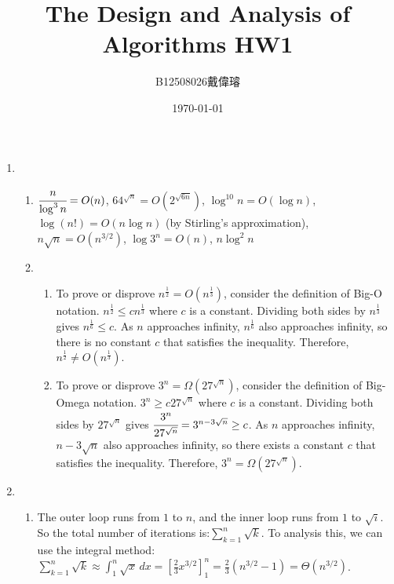 \documentclass[12pt,a4paper]{article}
\title{The Design and Analysis of Algorithms HW1}
\author{B12508026戴偉璿}
\date{\today}
\begin{document}
\maketitle


\begin{enumerate}
    \item 
    \begin{enumerate}
        \item $\cfrac{n}{\log^3 n} = O(n)$, $64^{\sqrt{n}} = O(2^{\sqrt{6n}})$, $\log^{10} n = O(\log n)$, \\$\log(n!) = O(n \log n)$ (by Stirling's approximation), $n\sqrt n = O(n^{3/2})$, $\log 3^n = O(n)$, $n\log^2 n$
        \item
        \begin{enumerate}
            \item {} To prove or disprove $n^\frac{1}{2} = O(n^\frac{1}{3})$, consider the definition of Big-O notation. $n^\frac{1}{2}\le cn^\frac{1}{3}$ where $c$ is a constant. Dividing both sides by $n^\frac{1}{3}$ gives $n^\frac{1}{6}\le c$. As $n$ approaches infinity, $n^\frac{1}{6}$ also approaches infinity, so there is no constant $c$ that satisfies the inequality. Therefore, $n^\frac{1}{2} \neq O(n^\frac{1}{3})$.
            \item {} To prove or disprove $3^n = \Omega(27^{\sqrt{n}})$, consider the definition of Big-Omega notation. $3^n\ge c27^{\sqrt{n}}$ where $c$ is a constant. Dividing both sides by $27^{\sqrt{n}}$ gives $\cfrac{3^n}{27^{\sqrt{n}}}=3^{n-3\sqrt{n}}\ge c$. As $n$ approaches infinity, $n-3\sqrt{n}$ also approaches infinity, so there exists a constant $c$ that satisfies the inequality. Therefore, $3^n = \Omega(27^{\sqrt{n}})$.
        \end{enumerate}
    \end{enumerate}
    \item
    \begin{enumerate}
        \item The outer loop runs from $1$ to $n$, and the inner loop runs from $1$ to $\sqrt{i}$. So the total number of iterations is:$\displaystyle\sum^n_{k=1}{\sqrt{k}}$. To analysis this, we can use the integral method:$\displaystyle\sum^n_{k=1}{\sqrt{k}} \approx \int_1^n \sqrt{x} \, dx = \left[ \frac{2}{3} x^{3/2} \right]_1^n = \frac{2}{3} (n^{3/2} - 1) = \Theta(n^{3/2})$.
    \end{enumerate}
\end{enumerate}
\end{document}

